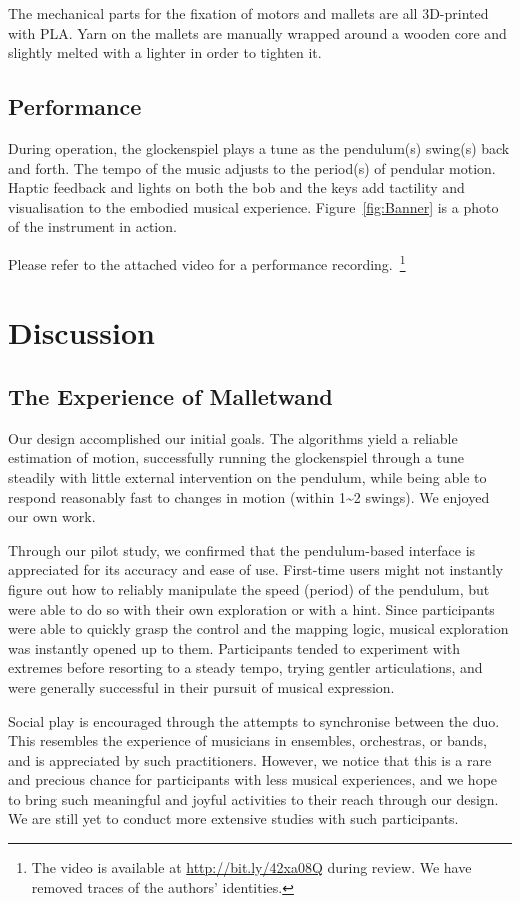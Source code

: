 \documentclass{nime-alternate} %
\begin{document}
The mechanical parts for the fixation of motors and mallets are all 3D-printed with PLA. Yarn on the mallets are manually wrapped around a wooden core and slightly melted with a lighter in order to tighten it.

\subsection{Performance}
During operation, the glockenspiel plays a tune as the pendulum(s) swing(s) back and forth. The tempo of the music adjusts to the period(s) of pendular motion. Haptic feedback and lights on both the bob and the keys add tactility and visualisation to the embodied musical experience. Figure~\ref{fig:Banner} is a photo of the instrument in action.

Please refer to the attached video for a performance recording.~\footnote{The video is available at \url{http://bit.ly/42xa08Q} during review. We have removed traces of the authors' identities.}

\section{Discussion}

\subsection{The Experience of Malletwand}
Our design accomplished our initial goals. The algorithms yield a reliable estimation of motion, successfully running the glockenspiel through a tune steadily with little external intervention on the pendulum, while being able to respond reasonably fast to changes in motion (within 1\textasciitilde{}2 swings). We enjoyed our own work.

Through our pilot study, we confirmed that the pendulum-based interface is appreciated for its accuracy and ease of use. First-time users might not instantly figure out how to reliably manipulate the speed (period) of the pendulum, but were able to do so with their own exploration or with a hint. Since participants were able to quickly grasp the control and the mapping logic, musical exploration was instantly opened up to them. Participants tended to experiment with extremes before resorting to a steady tempo, trying gentler articulations, and were generally successful in their pursuit of musical expression.

Social play is encouraged through the attempts to synchronise between the duo. This resembles the experience of musicians in ensembles, orchestras, or bands, and is appreciated by such practitioners. However, we notice that this is a rare and precious chance for participants with less musical experiences, and we hope to bring such meaningful and joyful activities to their reach through our design. We are still yet to conduct more extensive studies with such participants.
\end{document}
